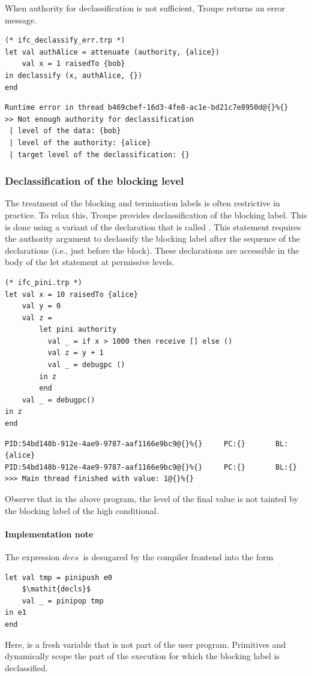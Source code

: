 When authority for declassification is not sufficient, Troupe returns an error message.
\begin{lstlisting}
(* ifc_declassify_err.trp *)
let val authAlice = attenuate (authority, {alice})
    val x = 1 raisedTo {bob}
in declassify (x, authAlice, {})
end     
\end{lstlisting}

\begin{lstlisting}
Runtime error in thread b469cbef-16d3-4fe8-ac1e-bd21c7e8950d@{}%{}
>> Not enough authority for declassification
 | level of the data: {bob}
 | level of the authority: {alice}
 | target level of the declassification: {}    
\end{lstlisting}

\subsubsection{Declassification of the blocking level}
\label{sec:pinidecl}
The treatment of the blocking and termination labels is often restrictive in practice. To relax this, 
Troupe provides declassification of the blocking label. This is done using 
a variant of the  declaration that is called . 
This statement requires the authority argument to declassify the blocking label 
after the sequence of the declarations (i.e., just before the  block).
These declarations are accessible in the body of the let statement at permissive
levels.

\begin{lstlisting}
(* ifc_pini.trp *)
let val x = 10 raisedTo {alice}
    val y = 0
    val z = 
        let pini authority
          val _ = if x > 1000 then receive [] else ()
          val z = y + 1
          val _ = debugpc () 
        in z
        end
    val _ = debugpc()
in z
end
\end{lstlisting}

\begin{verbatim}
PID:54bd148b-912e-4ae9-9787-aaf1166e9bc9@{}%{}     PC:{}       BL:{alice}           
PID:54bd148b-912e-4ae9-9787-aaf1166e9bc9@{}%{}     PC:{}       BL:{}            
>>> Main thread finished with value: 1@{}%{}
\end{verbatim}
Observe that in the above program, the level of the final value 
is not tainted by the blocking label of the high conditional. 


\paragraph{Implementation note}
The expression  $\mathit{decs}\ $ is desugared by the compiler frontend into the form 
\begin{lstlisting}
let val tmp = pinipush e0 
    $\mathit{decls}$
    val _ = pinipop tmp
in e1      
end
\end{lstlisting}
Here,  is a fresh variable that is not part of the user program. Primitives  and 
 dynamically scope the part of the execution for which the blocking label is declassified.



